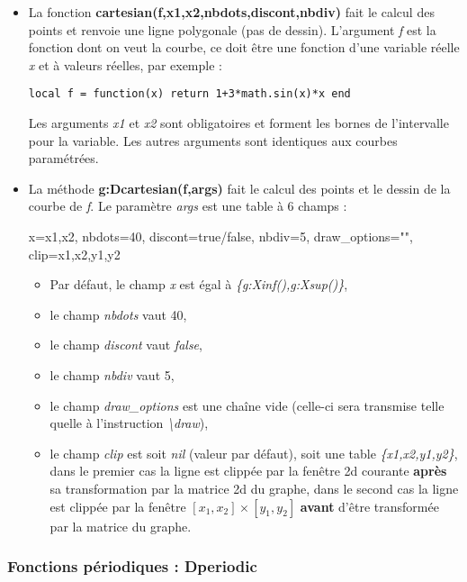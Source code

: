 \begin{itemize}
\item La fonction \textbf{cartesian(f,x1,x2,nbdots,discont,nbdiv)} fait le calcul des points et renvoie une ligne polygonale (pas de dessin). L'argument \emph{f} est la fonction dont on veut la courbe, ce doit être une fonction d'une variable réelle \emph{x} et à valeurs réelles, par exemple :

    \texttt{local f = function(x) return 1+3*math.sin(x)*x end}

    Les arguments \emph{x1} et \emph{x2} sont obligatoires et forment les bornes de l'intervalle pour la variable. Les autres arguments sont identiques aux courbes paramétrées.

\item La méthode \textbf{g:Dcartesian(f,args)} fait le calcul des points et le dessin de la courbe de \emph{f}. Le paramètre \emph{args} est une table à 6 champs :

\begin{TeXcode}
  { x={x1,x2}, nbdots=40, discont=true/false, nbdiv=5, draw_options="", clip={x1,x2,y1,y2} }
\end{TeXcode}
  
  \begin{itemize}
      \item   Par défaut, le champ \emph{x} est égal à \emph{\{g:Xinf(),g:Xsup()\}}, 
      \item le champ \emph{nbdots} vaut 40, 
      \item le champ \emph{discont} vaut \emph{false}, 
      \item le champ \emph{nbdiv} vaut 5, 
      \item le champ \emph{draw\_options} est une chaîne vide (celle-ci sera transmise telle quelle à l'instruction \emph{\textbackslash draw}),
      \item le champ \emph{clip} est soit \emph{nil} (valeur par défaut), soit une table \emph{\{x1,x2,y1,y2\}}, dans le premier cas la ligne est clippée par la fenêtre 2d courante \textbf{après} sa transformation par la matrice 2d du graphe, dans le second cas la ligne est clippée par la fenêtre $[x_1,x_2]\times[y_1,y_2]$ \textbf{avant} d'être transformée par la matrice du graphe.
  \end{itemize}
\end{itemize}

\subsubsection{Fonctions périodiques : Dperiodic}

